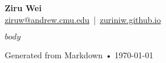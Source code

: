 \documentclass[a4paper,9pt]{extarticle}
\begin{document}
\pagestyle{empty}

\begin{center}
    {\Huge\bfseries Ziru Wei}\\[4pt]
    {\normalsize
      \href{mailto:ziruw@andrew.cmu.edu}{ziruw@andrew.cmu.edu} \,|\, 
      \href{https://zuriniw.github.io}{zuriniw.github.io}
    }\\
    \end{center}
    \vspace{0.5em}
    

$body$

\vfill
\begin{center}
\small{Generated from Markdown • \today}
\end{center}
\end{document}

